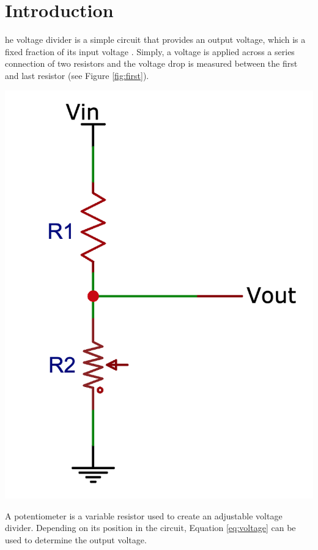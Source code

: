 \documentclass[journal]{IEEEtran}
\begin{document}
\section{Introduction}
\lowercase{he} voltage divider is a simple circuit that provides an output voltage, which is a fixed fraction of its input voltage \cite[]{hayt1986engineering}. Simply, a voltage is applied across a series connection of two resistors and the voltage drop is measured between the first and last resistor (see Figure \ref{fig:first}).

\begingroup
    \medskip
    \centering
    \includegraphics[scale=0.5]{images/lab1_1.png}
    \label{fig:first}
    \medskip
\endgroup

\noindent A potentiometer is a variable resistor used to create an adjustable voltage divider. Depending on its position in the circuit, Equation \ref{eq:voltage} can be used to determine the output voltage.   
\end{document}
